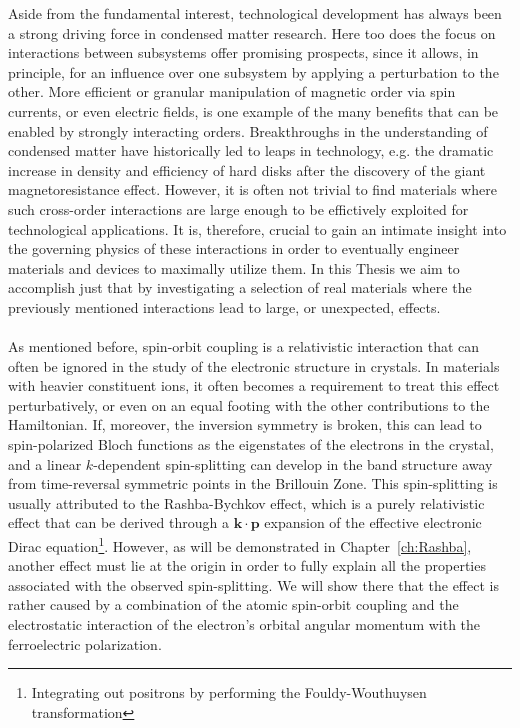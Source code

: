 Aside from the fundamental interest, technological development has always been a strong driving force in condensed matter research. Here too does the focus on interactions between subsystems offer promising prospects, since it allows, in principle, for an influence over one subsystem by applying a perturbation to the other.
More efficient or granular manipulation of magnetic order via spin currents, or even electric fields, is one example of the many benefits that can be enabled by strongly interacting orders.
Breakthroughs in the understanding of condensed matter have historically led to leaps in technology, e.g. the dramatic increase in density and efficiency of hard disks after the discovery of the giant magnetoresistance effect.
However, it is often not trivial to find materials where such cross-order interactions are large enough to be effictively exploited for technological applications.
It is, therefore, crucial to gain an intimate insight into the governing physics of these interactions in order to eventually engineer materials and devices to maximally utilize them.
In this Thesis we aim to accomplish just that by investigating a selection of real materials where the previously mentioned interactions lead to large, or unexpected, effects.
\\\\
As mentioned before, spin-orbit coupling is a relativistic interaction that can often be ignored in the study of the electronic structure in crystals.
In materials with heavier constituent ions, it often becomes a requirement to treat this effect perturbatively, or even on an equal footing with the other contributions to the Hamiltonian.
If, moreover, the inversion symmetry is broken, this can lead to spin-polarized Bloch functions as the eigenstates of the electrons in the crystal, and a linear $k$-dependent spin-splitting can develop in the band structure away from time-reversal symmetric points in the Brillouin Zone.
This spin-splitting is usually attributed to the Rashba-Bychkov effect, which is a purely relativistic effect that can be derived through a $\bm{k}\cdot \bm{p}$ expansion of the effective electronic Dirac equation\footnote{Integrating out positrons by performing the Fouldy-Wouthuysen transformation}.
However, as will be demonstrated in Chapter~\ref{ch:Rashba}, another effect must lie at the origin in order to fully explain  all the properties associated with the observed spin-splitting.
We will show there that the effect is rather caused by a combination of the atomic spin-orbit coupling and the electrostatic interaction of the electron's orbital angular momentum with the ferroelectric polarization.
